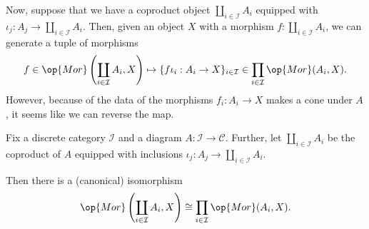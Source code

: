 Now, suppose that we have a coproduct object $\coprod_{i\in\mathcal I}A_i$ equipped with $\iota_j:A_j\to\coprod_{i\in\mathcal I}A_i$. Then, given an object $X$ with a morphism $f:\coprod_{i\in\mathcal I}A_i$, we can generate a tuple of morphisms
\[f\in\op{Mor}\left(\coprod_{i\in\mathcal I}A_i,X\right)\mapsto\{f\iota_i:A_i\to X\}_{i\in\mathcal I}\in\prod_{i\in\mathcal I}\op{Mor}(A_i,X).\]
However, because of the data of the morphisms $f_i:A_i\to X$ makes a cone under $A$, it seems like we can reverse the map.
\begin{proposition} \label{prop:coprodup}
	Fix a discrete category $\mathcal I$ and a diagram $A:\mathcal I\to\mathcal C$. Further, let $\coprod_{i\in\mathcal I}A_i$ be the coproduct of $A$ equipped with inclusions $\iota_j:A_j\to\coprod_{i\in\mathcal I}A_i$.
	
	Then there is a (canonical) isomorphism
	\[\op{Mor}\left(\coprod_{i\in\mathcal I}A_i,X\right)\cong\prod_{i\in\mathcal I}\op{Mor}(A_i,X).\]
\end{proposition}
